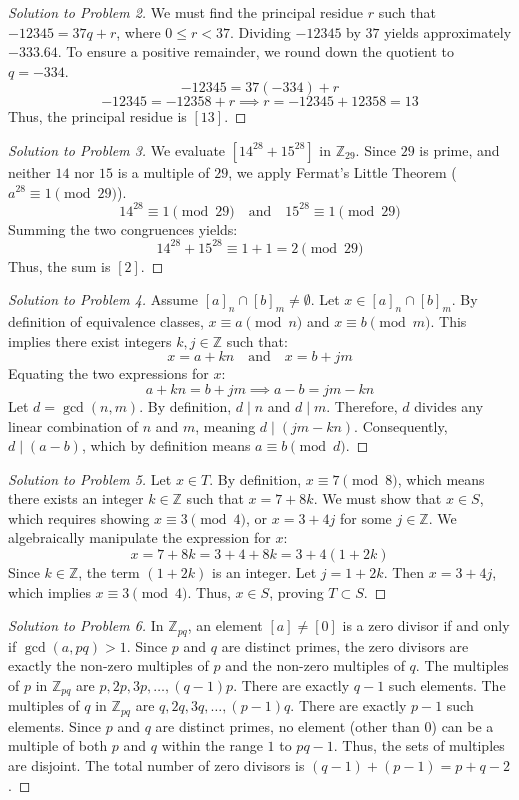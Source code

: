\documentclass[11pt, a4paper]{article}
\theoremstyle{definition}
\theoremstyle{remark}
\newcommand{\Z}{\mathbb{Z}}
\begin{document}
\begin{proof}[Solution to Problem 2]
We must find the principal residue $r$ such that $-12345 = 37q + r$, where $0 \le r < 37$. 
Dividing $-12345$ by $37$ yields approximately $-333.64$. To ensure a positive remainder, we round down the quotient to $q = -334$.
\[ -12345 = 37(-334) + r \]
\[ -12345 = -12358 + r \implies r = -12345 + 12358 = 13 \]
Thus, the principal residue is $[13]$.
\end{proof}

\begin{proof}[Solution to Problem 3]
We evaluate $[14^{28} + 15^{28}]$ in $\Z_{29}$. Since $29$ is prime, and neither $14$ nor $15$ is a multiple of $29$, we apply Fermat's Little Theorem ($a^{28} \equiv 1 \pmod{29}$).
\[ 14^{28} \equiv 1 \pmod{29} \quad \text{and} \quad 15^{28} \equiv 1 \pmod{29} \]
Summing the two congruences yields:
\[ 14^{28} + 15^{28} \equiv 1 + 1 = 2 \pmod{29} \]
Thus, the sum is $[2]$.
\end{proof}

\begin{proof}[Solution to Problem 4]
Assume $[a]_n \cap [b]_m \neq \emptyset$. Let $x \in [a]_n \cap [b]_m$. 
By definition of equivalence classes, $x \equiv a \pmod n$ and $x \equiv b \pmod m$. 
This implies there exist integers $k, j \in \Z$ such that:
\[ x = a + kn \quad \text{and} \quad x = b + jm \]
Equating the two expressions for $x$:
\[ a + kn = b + jm \implies a - b = jm - kn \]
Let $d = \gcd(n,m)$. By definition, $d \mid n$ and $d \mid m$. Therefore, $d$ divides any linear combination of $n$ and $m$, meaning $d \mid (jm - kn)$. 
Consequently, $d \mid (a - b)$, which by definition means $a \equiv b \pmod d$.
\end{proof}

\begin{proof}[Solution to Problem 5]
Let $x \in T$. By definition, $x \equiv 7 \pmod 8$, which means there exists an integer $k \in \Z$ such that $x = 7 + 8k$. 
We must show that $x \in S$, which requires showing $x \equiv 3 \pmod 4$, or $x = 3 + 4j$ for some $j \in \Z$.
We algebraically manipulate the expression for $x$:
\[ x = 7 + 8k = 3 + 4 + 8k = 3 + 4(1 + 2k) \]
Since $k \in \Z$, the term $(1 + 2k)$ is an integer. Let $j = 1 + 2k$. Then $x = 3 + 4j$, which implies $x \equiv 3 \pmod 4$. Thus, $x \in S$, proving $T \subset S$.
\end{proof}

\begin{proof}[Solution to Problem 6]
In $\Z_{pq}$, an element $[a] \neq [0]$ is a zero divisor if and only if $\gcd(a, pq) > 1$. Since $p$ and $q$ are distinct primes, the zero divisors are exactly the non-zero multiples of $p$ and the non-zero multiples of $q$.
The multiples of $p$ in $\Z_{pq}$ are $p, 2p, 3p, \dots, (q-1)p$. There are exactly $q-1$ such elements.
The multiples of $q$ in $\Z_{pq}$ are $q, 2q, 3q, \dots, (p-1)q$. There are exactly $p-1$ such elements.
Since $p$ and $q$ are distinct primes, no element (other than $0$) can be a multiple of both $p$ and $q$ within the range $1$ to $pq-1$. Thus, the sets of multiples are disjoint.
The total number of zero divisors is $(q-1) + (p-1) = p + q - 2$.
\end{proof}
\end{document}
